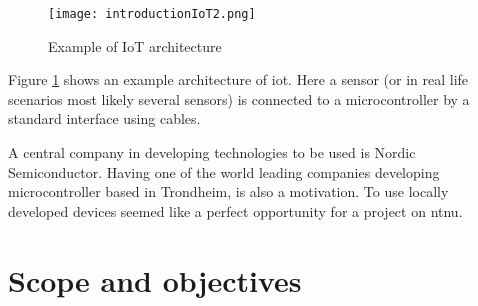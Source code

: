 \begin{figure}[ht]
    \centering
    \texttt{[image: introductionIoT2.png]}    
    \caption{Example of IoT architecture}
    \label{iotExampleArchitecture}
\end{figure}

\noindent Figure \ref{iotExampleArchitecture} shows an example architecture of \gls{iot}. Here a sensor (or in real life scenarios most likely several sensors) is connected to a \gls{microcontroller} by a standard interface using cables. 




\noindent A central company in developing technologies to be used is Nordic Semiconductor. Having one of the world leading companies developing \gls{microcontroller} based in Trondheim, is also a motivation. To use locally developed devices seemed like a perfect opportunity for a project on \gls{ntnu}. 






\newpage

\section{Scope and objectives}

